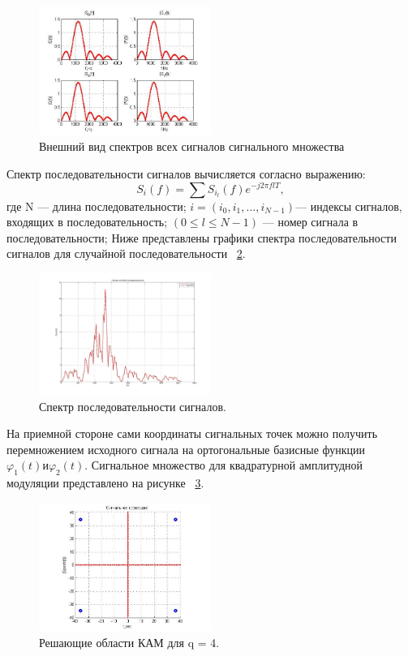 \begin{figure}[H]
 	\centering
 	\includegraphics[width=0.5\textwidth]{img/mal4}
 	\caption{Внешний вид спектров всех сигналов сигнального множества}
 	\label{fig:mal4}
\end{figure}
Спектр последовательности сигналов вычисляется согласно выражению:
\begin{equation}
S_{i}(f)=\sum S_{i_{l}}(f)e^{-j2\pi flT},
\end{equation}
где N --- длина последовательности; $i=(i_{0},i_{1},...,i_{N-1})$--- индексы сигналов, входящих в последовательность; $(0\leq l\leq N-1)$ --- номер сигнала в последовательности; 
Ниже представлены графики спектра последовательности сигналов для случайной последовательности ~\ref{fig:mal5}.
\begin{figure}[H]
	\centering
	\includegraphics[width=0.5\textwidth]{img/mal5}
	\caption{Спектр последовательности сигналов.}
	\label{fig:mal5}
\end{figure} 
 
 На приемной стороне сами координаты сигнальных точек можно получить перемножением исходного сигнала   на ортогональные базисные функции $ \varphi_{1}(t) и \varphi_{2}(t)$. Сигнальное множество для квадратурной амплитудной модуляции представлено на рисунке ~\ref{fig:mal6}.
 
 \begin{figure}[H]
 	\centering
 	\includegraphics[width=0.5\textwidth]{img/mal6}
 	\caption{Решающие области КАМ для q = 4.}
 	\label{fig:mal6}
 \end{figure} 
